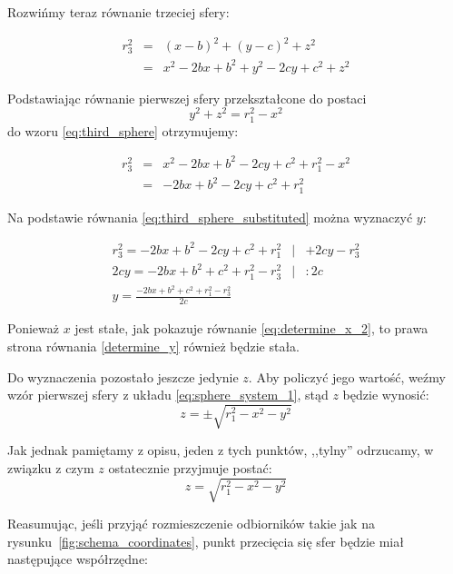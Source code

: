 Rozwińmy teraz równanie trzeciej sfery:

\begin{eqnarray}
 r^2_3 & = & (x - b)^2 + (y - c)^2 + z^2 \label{eq:third_sphere} \\
       & = & x^2 - 2bx + b^2 + y^2 - 2cy + c^2 + z^2 \nonumber
\end{eqnarray}

Podstawiając równanie pierwszej sfery przekształcone do postaci
\begin{equation*}
 y^2 + z^2 = r_1^2 - x^2
\end{equation*}
do wzoru \ref{eq:third_sphere} otrzymujemy:

\begin{eqnarray}
r_3^2 & = & x^2 - 2bx + b^2 - 2cy + c^2 + r_1^2 - x^2 \label{eq:third_sphere_substituted} \\
      & = & -2bx + b^2 - 2cy + c^2 + r_1^2 \nonumber
\end{eqnarray}

Na podstawie równania \ref{eq:third_sphere_substituted} można wyznaczyć $y$:

\begin{eqnarray}
 r_3^2 = -2bx + b^2 - 2cy + c^2 + r_1^2 & | & +2cy - r_3^2 \\
 2cy = -2bx + b^2 + c^2 + r_1^2 - r_3^2 & | & \colon 2c \\
 y   = \frac{-2bx + b^2 + c^2 + r_1^2 - r_3^2}{2c} \label{determine_y}
\end{eqnarray}

Ponieważ $x$ jest stałe, jak pokazuje równanie \ref{eq:determine_x_2}, to prawa strona równania \ref{determine_y} również będzie stała.

Do wyznaczenia pozostało jeszcze jedynie $z$. Aby policzyć jego wartość, weźmy wzór pierwszej sfery z układu \ref{eq:sphere_system_1}, stąd $z$ będzie wynosić:
\begin{equation}
 z = \pm\sqrt{r_1^2 - x^2 - y^2}
\end{equation}

Jak jednak pamiętamy z opisu, jeden z tych punktów, ,,tylny'' odrzucamy, w związku z czym $z$ ostatecznie przyjmuje postać:
\begin{equation}
 z = \sqrt{r_1^2 - x^2 - y^2}
\end{equation}

Reasumując, jeśli przyjąć rozmieszczenie odbiorników takie jak na rysunku~\ref{fig:schema_coordinates}, punkt przecięcia się sfer będzie miał następujące współrzędne:

